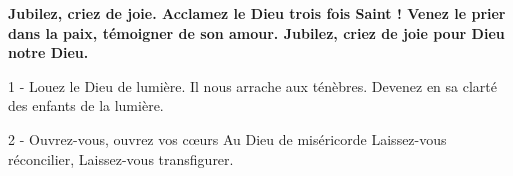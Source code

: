 
\textbf{Jubilez, criez de joie. Acclamez le Dieu trois fois Saint ! Venez le prier dans la paix, témoigner de son amour.
Jubilez, criez de joie pour Dieu notre Dieu.}

1 - Louez le Dieu de lumière. Il nous arrache aux ténèbres.
Devenez en sa clarté des enfants de la lumière.

2 - 
Ouvrez-vous, ouvrez vos cœurs Au Dieu de miséricorde
Laissez-vous réconcilier, Laissez-vous transfigurer.

